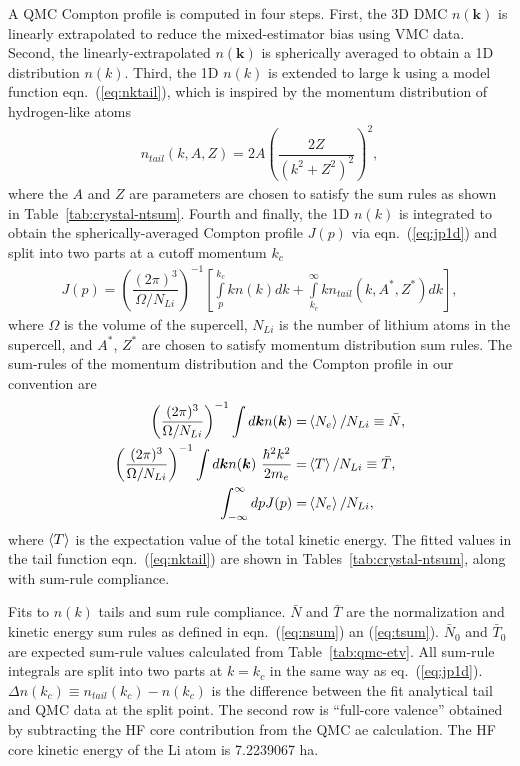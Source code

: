 \documentclass[aps,prl,superscriptaddress]{revtex4-1}
\newcommand{\bs}{\boldsymbol}
\begin{document}
A QMC Compton profile is computed in four steps. First, the 3D DMC $n(\bs{k})$ is linearly extrapolated to reduce the mixed-estimator bias using VMC data. Second, the linearly-extrapolated $n(\bs{k})$ is spherically averaged to obtain a 1D distribution $n(k)$. Third, the 1D $n(k)$ is extended to large k using a model function eqn.~(\ref{eq:nktail}), which is inspired by the momentum distribution of hydrogen-like atoms
\begin{align} \label{eq:nktail}
n_{tail}(k, A, Z) = 2A\left(\dfrac{2Z}{(k^2+Z^2)^2}\right)^2,
\end{align}
where the $A$ and $Z$ are parameters are chosen to satisfy the sum rules as shown in Table~\ref{tab:crystal-ntsum}. Fourth and finally, the 1D $n(k)$ is integrated to obtain the spherically-averaged Compton profile $J(p)$ via eqn.~(\ref{eq:jp1d}) and split into two parts at a cutoff momentum $k_c$
\begin{align} \label{eq:jp1d}
J(p) = \left( \dfrac{(2\pi)^3}{\Omega/N_{Li}} \right)^{-1} \left[
\int\limits_p^{k_c} k n(k) dk + \int\limits_{k_c}^{\infty} k n_{tail}(k, A^*, Z^*) dk
\right],
\end{align}
where $\Omega$ is the volume of the supercell, $N_{Li}$ is the number of lithium atoms in the supercell, and $A^*$, $Z^*$ are chosen to satisfy momentum distribution sum rules. %
The sum-rules of the momentum distribution and the Compton profile in our convention are
\begin{align}
\left( \dfrac{(2\pi)^3}{\Omega/N_{Li}} \right)^{-1} \int d\bs{k} n(\bs{k}) =& \braket{N_e}/N_{Li}\equiv \bar{N}, \label{eq:nsum} \\
\left( \dfrac{(2\pi)^3}{\Omega/N_{Li}} \right)^{-1} \int d\bs{k} n(\bs{k})~\frac{\hbar^2k^2}{2m_e} =& \braket{T}/N_{Li} \equiv \bar{T}, \label{eq:tsum} \\
\int_{-\infty}^{\infty} dp J(p) =& \braket{N_e}/N_{Li}, \label{eq:jpsum}
\end{align}
where $\braket{T}$ is the expectation value of the total kinetic energy.
The fitted values in the tail function eqn.~(\ref{eq:nktail}) are shown in Tables~\ref{tab:crystal-ntsum}, along with sum-rule compliance.

\begin{table}[h]
\caption{Fits to $n(k)$ tails and sum rule compliance. $\bar{N}$ and $\bar{T}$ are the normalization and kinetic energy sum rules as defined in eqn.~(\ref{eq:nsum}) an (\ref{eq:tsum}). $\bar{N}_0$ and $\bar{T}_0$ are expected sum-rule values calculated from Table~\ref{tab:qmc-etv}. All sum-rule integrals are split into two parts at $k=k_c$ in the same way as eq.~(\ref{eq:jp1d}). $\Delta n(k_c)\equiv n_{tail}(k_c)-n(k_c)$ is the difference between the fit analytical tail and QMC data at the split point. The second row is ``full-core valence'' obtained by subtracting the HF core contribution from the QMC ae calculation. The HF core kinetic energy of the Li atom is 7.2239067 ha.}

\label{tab:crystal-ntsum}
\end{table}
\end{document}
